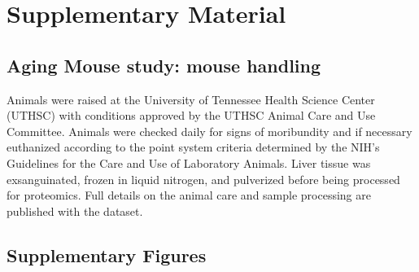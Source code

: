 \documentclass[num-refs]{wiley-article}
\newcommand{\beginsupplement}{%
	\setcounter{table}{0}
	\renewcommand{\thetable}{S\arabic{table}}%
	\setcounter{figure}{0}
	\renewcommand{\thefigure}{S\arabic{figure}}%
}
\begin{document}
\printendnotes




\newpage
\section{Supplementary Material}
\beginsupplement

\subsection{Aging Mouse study: mouse handling}
Animals were raised at the University of Tennessee Health Science Center (UTHSC) with conditions approved by the UTHSC Animal Care and Use Committee. Animals were checked daily for signs of moribundity and if necessary euthanized according to the point system criteria determined by the NIH’s Guidelines for the Care and Use of Laboratory Animals. Liver tissue was exsanguinated, frozen in liquid nitrogen, and pulverized before being processed for proteomics. Full details on the animal care and sample processing are published with the dataset.

\subsection{Supplementary Figures}
\end{document}
